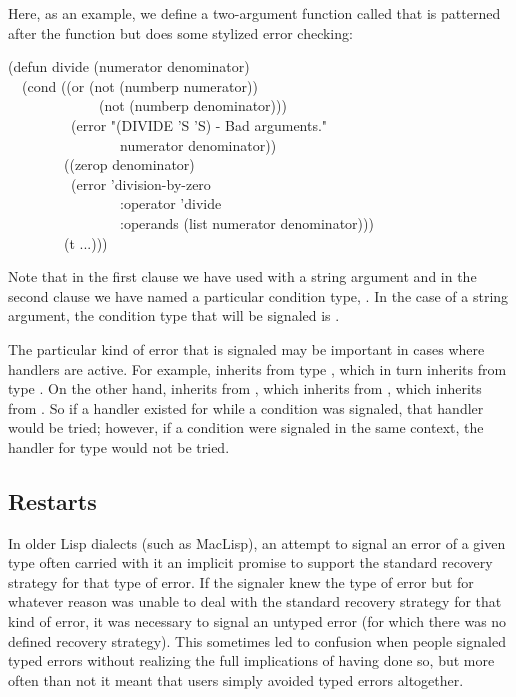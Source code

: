 Here, as an example,
we define a two-argument function called  that is patterned after
the \cdf{/} function but does some stylized error checking:
\begin{lisp}
(defun divide (numerator denominator) \\
~~(cond ((or (not (numberp numerator)) \\
~~~~~~~~~~~~~(not (numberp denominator))) \\
~~~~~~~~~(error "(DIVIDE '{\Xtilde}S '{\Xtilde}S) - Bad arguments." \\
~~~~~~~~~~~~~~~~numerator denominator)) \\
~~~~~~~~((zerop denominator) \\
~~~~~~~~~(error 'division-by-zero \\
~~~~~~~~~~~~~~~~:operator 'divide \\
~~~~~~~~~~~~~~~~:operands (list numerator denominator))) \\
~~~~~~~~(t ...)))
\end{lisp}
Note that in the first clause we have used  with a string argument
and in the second clause we have named a particular condition type,
. In the case of a string argument, the condition type that
will be signaled is .

The particular kind of error that is signaled may be important
in cases where handlers are active. For example,  inherits 
from type , which in turn inherits from type . On the 
other hand,  inherits from , which 
inherits from , which inherits from . So if a handler
existed for  while a  condition was
signaled, that handler would be tried; however, if a 
condition were signaled in the same context, the handler for type
 would not be tried.


\subsection{Restarts}
\label{RESTARTS}

In older Lisp dialects (such as MacLisp), an attempt to signal an error of a
given type often carried with it an implicit promise to support the standard
recovery strategy for that type of error. If the signaler knew the type of
error but for whatever reason was unable to deal with the standard recovery
strategy for that kind of error, it was necessary to signal an untyped error
(for which there was no defined recovery strategy). This sometimes led to
confusion when people signaled typed errors without realizing the full
implications of having done so, but more often than not it meant that users
simply avoided typed errors altogether.

